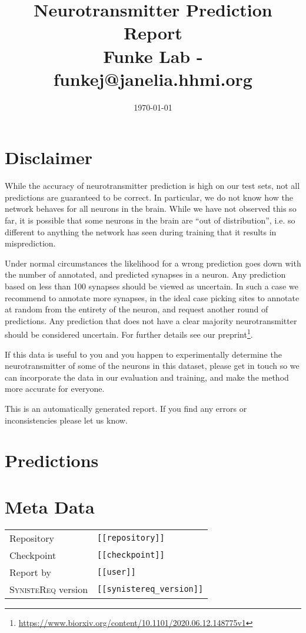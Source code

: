 \documentclass{article}
\begin{document}
\title{
  Neurotransmitter Prediction Report\\
  \small{Funke Lab - funkej@janelia.hhmi.org}
}
\date{\today}
\maketitle

\section{Disclaimer}

While the accuracy of neurotransmitter prediction is high on our test sets, not
all predictions are guaranteed to be correct. In particular, we do not know how
the network behaves for all neurons in the brain. While we have not observed
this so far, it is possible that some neurons in the brain are ``out of
distribution'', i.e. so different to anything the network has seen during
training that it results in misprediction.

\vspace{5mm}
\noindent
Under normal circumstances the likelihood for a wrong prediction goes down with
the number of annotated, and predicted synapses in a neuron. Any prediction
based on less than 100 synapses should be viewed as uncertain. In such a case
we recommend to annotate more synapses, in the ideal case picking sites to
annotate at random from the entirety of the neuron, and request another round
of predictions. Any prediction that does not have a clear majority
neurotransmitter should be considered uncertain. For further details see our
preprint\footnote{\url{https://www.biorxiv.org/content/10.1101/2020.06.12.148775v1}}.

\vspace{5mm}
\noindent
If this data is useful to you and you happen to experimentally determine the
neurotransmitter of some of the neurons in this dataset, please get in touch so
we can incorporate the data in our evaluation and training, and make the method
more accurate for everyone.

\vspace{5mm}
\noindent
This is an automatically generated report. If you find any errors or
inconsistencies please let us know.

\clearpage
\section{Predictions}



\section{Meta Data}

\footnotesize
\begin{tabular}{ll}
  Repository                  & \verb![[repository]]! \\
  Checkpoint                  & \verb![[checkpoint]]! \\
  Report by                   & \verb![[user]]! \\
  \textsc{SynisteReq} version & \verb![[synistereq_version]]! \\
\end{tabular}
\end{document}

